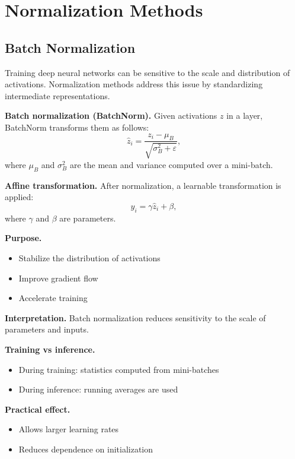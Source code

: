 \chapter{Normalization Methods}

\section{Batch Normalization}

Training deep neural networks can be sensitive to the scale and distribution of activations. Normalization methods address this issue by standardizing intermediate representations.

\medskip

\noindent
\textbf{Batch normalization (BatchNorm).}  
Given activations $z$ in a layer, BatchNorm transforms them as follows:
\[
\hat{z}_i = \frac{z_i - \mu_B}{\sqrt{\sigma_B^2 + \varepsilon}},
\]
where $\mu_B$ and $\sigma_B^2$ are the mean and variance computed over a mini-batch.

\medskip

\noindent
\textbf{Affine transformation.}  
After normalization, a learnable transformation is applied:
\[
y_i = \gamma \hat{z}_i + \beta,
\]
where $\gamma$ and $\beta$ are parameters.

\medskip

\noindent
\textbf{Purpose.}
\begin{itemize}
    \item Stabilize the distribution of activations
    \item Improve gradient flow
    \item Accelerate training
\end{itemize}

\medskip

\noindent
\textbf{Interpretation.}  
Batch normalization reduces sensitivity to the scale of parameters and inputs.

\medskip

\noindent
\textbf{Training vs inference.}
\begin{itemize}
    \item During training: statistics computed from mini-batches
    \item During inference: running averages are used
\end{itemize}

\medskip

\noindent
\textbf{Practical effect.}
\begin{itemize}
    \item Allows larger learning rates
    \item Reduces dependence on initialization
\end{itemize}

